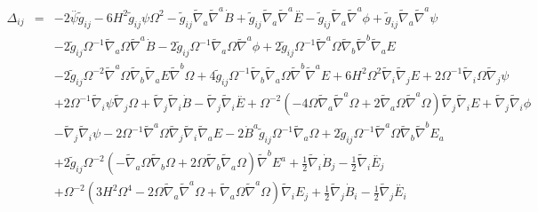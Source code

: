 \documentclass[10pt,letterpaper]{article}
\numberwithin{equation}{section}
\begin{document}
\begin{eqnarray}
\\  \nonumber\\ 
\Delta_{ij}&=& -2 \overset{..}{\psi} \tilde{g}_{ij} - 6 H^2 \tilde{g}_{ij} \psi \Omega^2 -  \tilde{g}_{ij} \tilde{\nabla}_{a}\tilde{\nabla}^{a}\dot{B} + \tilde{g}_{ij} \tilde{\nabla}_{a}\tilde{\nabla}^{a}\overset{..}{E} -  \tilde{g}_{ij} \tilde{\nabla}_{a}\tilde{\nabla}^{a}\phi + \tilde{g}_{ij} \tilde{\nabla}_{a}\tilde{\nabla}^{a}\psi \nonumber \\ 
&& - 2 \tilde{g}_{ij} \Omega^{-1} \tilde{\nabla}_{a}\Omega \tilde{\nabla}^{a}\dot{B} - 2 \tilde{g}_{ij} \Omega^{-1} \tilde{\nabla}_{a}\Omega \tilde{\nabla}^{a}\phi + 2 \tilde{g}_{ij} \Omega^{-1} \tilde{\nabla}^{a}\Omega \tilde{\nabla}_{b}\tilde{\nabla}^{b}\tilde{\nabla}_{a}E \nonumber \\ 
&& - 2 \tilde{g}_{ij} \Omega^{-2} \tilde{\nabla}^{a}\Omega \tilde{\nabla}_{b}\tilde{\nabla}_{a}E \tilde{\nabla}^{b}\Omega + 4 \tilde{g}_{ij} \Omega^{-1} \tilde{\nabla}_{b}\tilde{\nabla}_{a}\Omega \tilde{\nabla}^{b}\tilde{\nabla}^{a}E + 6 H^2 \Omega^2 \tilde{\nabla}_{i}\tilde{\nabla}_{j}E + 2 \Omega^{-1} \tilde{\nabla}_{i}\Omega \tilde{\nabla}_{j}\psi \nonumber \\ 
&& + 2 \Omega^{-1} \tilde{\nabla}_{i}\psi \tilde{\nabla}_{j}\Omega + \tilde{\nabla}_{j}\tilde{\nabla}_{i}\dot{B} -  \tilde{\nabla}_{j}\tilde{\nabla}_{i}\overset{..}{E} + \Omega^{-2} (-4 \Omega \tilde{\nabla}_{a}\tilde{\nabla}^{a}\Omega + 2 \tilde{\nabla}_{a}\Omega \tilde{\nabla}^{a}\Omega) \tilde{\nabla}_{j}\tilde{\nabla}_{i}E + \tilde{\nabla}_{j}\tilde{\nabla}_{i}\phi \nonumber \\ 
&& -  \tilde{\nabla}_{j}\tilde{\nabla}_{i}\psi - 2 \Omega^{-1} \tilde{\nabla}^{a}\Omega \tilde{\nabla}_{j}\tilde{\nabla}_{i}\tilde{\nabla}_{a}E-2 \dot{B}^{a} \tilde{g}_{ij} \Omega^{-1} \tilde{\nabla}_{a}\Omega + 2 \tilde{g}_{ij} \Omega^{-1} \tilde{\nabla}^{a}\Omega \tilde{\nabla}_{b}\tilde{\nabla}^{b}E_{a} \nonumber \\ 
&& + 2 \tilde{g}_{ij} \Omega^{-2} (- \tilde{\nabla}_{a}\Omega \tilde{\nabla}_{b}\Omega + 2 \Omega \tilde{\nabla}_{b}\tilde{\nabla}_{a}\Omega) \tilde{\nabla}^{b}E^{a} + \tfrac{1}{2} \tilde{\nabla}_{i}\dot{B}_{j} -  \tfrac{1}{2} \tilde{\nabla}_{i}\overset{..}{E}_{j} \nonumber \\ 
&& + \Omega^{-2} (3 H^2 \Omega^4 - 2 \Omega \tilde{\nabla}_{a}\tilde{\nabla}^{a}\Omega + \tilde{\nabla}_{a}\Omega \tilde{\nabla}^{a}\Omega) \tilde{\nabla}_{i}E_{j} + \tfrac{1}{2} \tilde{\nabla}_{j}\dot{B}_{i} -  \tfrac{1}{2} \tilde{\nabla}_{j}\overset{..}{E}_{i} \nonumber \\ 

\end{eqnarray}
\end{document}
